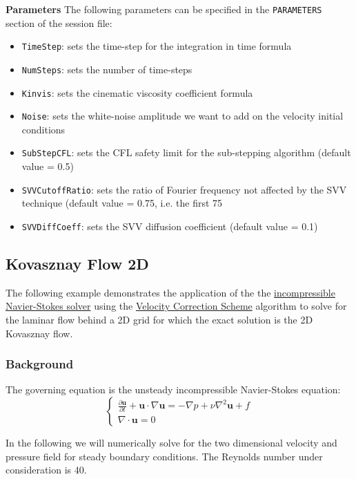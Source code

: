 \textbf{Parameters}
 The following parameters can be specified in the \texttt{PARAMETERS} section of the session file: 
 
 \begin{itemize}
\item \texttt{TimeStep}: sets the time-step for the integration in time formula
\item  \texttt{NumSteps}: sets the number of time-steps
\item  \texttt{Kinvis}: sets the cinematic viscosity coefficient formula
\item  \texttt{Noise}: sets the white-noise amplitude we want to add on the velocity initial conditions
\item  \texttt{SubStepCFL}: sets the CFL safety limit for the sub-stepping algorithm (default value = 0.5)
\item  \texttt{SVVCutoffRatio}: sets the ratio of Fourier frequency not affected by the SVV technique (default value = 0.75, i.e. the first 75%
\item  \texttt{SVVDiffCoeff}: sets the SVV diffusion coefficient (default value = 0.1) 
 \end{itemize}



\subsection{Kovasznay Flow 2D}
\label{KovasznayFlow2D}
The following example demonstrates the application of the the \hyperref[IncNSsolver]{incompressible Navier-Stokes solver} using the \hyperref[VCSscheme]{Velocity Correction Scheme} algorithm to solve for the laminar flow behind a 2D grid for which the exact solution is the 2D Kovasznay flow.

\subsubsection{Background}
The governing equation is the unsteady incompressible Navier-Stokes equation:
\begin{equation}
\begin{cases}
\frac{\partial \textbf{u}}{\partial t} + \textbf{u} \cdot \nabla \textbf{u} = - \nabla p + \nu \nabla^2 \textbf{u} + f \\
\nabla \cdot \textbf{u} = 0
\end{cases}
\end{equation}

In the following we will numerically solve for the two dimensional velocity and pressure field for steady boundary conditions. The Reynolds number under consideration is 40.

